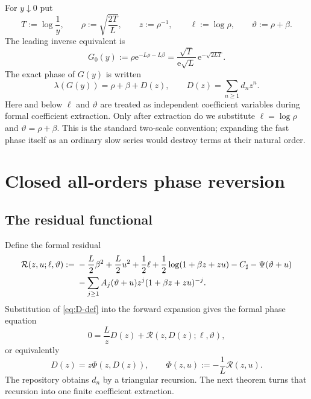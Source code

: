 \documentclass[11pt,oneside]{article}
\numberwithin{equation}{section}
\theoremstyle{definition}
\theoremstyle{remark}
\newcommand{\e}{\mathrm e}
\newcommand{\phase}{\vartheta}
\begin{document}
For $y\downarrow0$ put
\begin{equation}
 T:=\log\frac1y,
 \qquad
 \rho:=\sqrt{\frac{2T}{L}},
 \qquad
 z:=\rho^{-1},
 \qquad
 \ell:=\log\rho,
 \qquad
 \phase:=\rho+\beta.
 \label{eq:T-rho-z-theta}
\end{equation}
The leading inverse equivalent is
\begin{equation}
 G_0(y):=\rho\e^{-L\rho-L\beta}
 =\frac{\sqrt T}{\e\sqrt L}\,
   \e^{-\sqrt{2LT}}.
 \label{eq:G0}
\end{equation}
The exact phase of $G(y)$ is written
\begin{equation}
 \lambda(G(y))=\rho+\beta+D(z),
 \qquad
 D(z)=\sum_{n\ge1}d_nz^n.
 \label{eq:D-def}
\end{equation}
Here and below $\ell$ and $\phase$ are treated as independent coefficient
variables during formal coefficient extraction.  Only after extraction do we
substitute $\ell=\log\rho$ and $\phase=\rho+\beta$.  This is the standard
two-scale convention; expanding the fast phase itself as an ordinary slow
series would destroy terms at their natural order.

\section{Closed all-orders phase reversion}
\label{sec:closed-reversion}

\subsection{The residual functional}

Define the formal residual
\begin{align}
 \mathcal R(z,u;\ell,\phase):={}&
 -\frac L2\beta^2+\frac L2u^2+\frac12\ell
 +\frac12\log(1+\beta z+zu)-C_{\sharp}-\Psi(\phase+u)
 \notag\\
 &-\sum_{j\ge1}A_j(\phase+u)z^j(1+\beta z+zu)^{-j}.
 \label{eq:R-functional}
\end{align}
Substitution of \eqref{eq:D-def} into the forward expansion gives the formal
phase equation
\begin{equation}
 0=\frac LzD(z)+\mathcal R(z,D(z);\ell,\phase),
 \label{eq:phase-equation}
\end{equation}
or equivalently
\begin{equation}
 D(z)=z\Phi(z,D(z)),
 \qquad
 \Phi(z,u):=-\frac1L\mathcal R(z,u).
 \label{eq:D-implicit}
\end{equation}
The repository obtains $d_n$ by a triangular recursion.  The next theorem
turns that recursion into one finite coefficient extraction.
\end{document}
